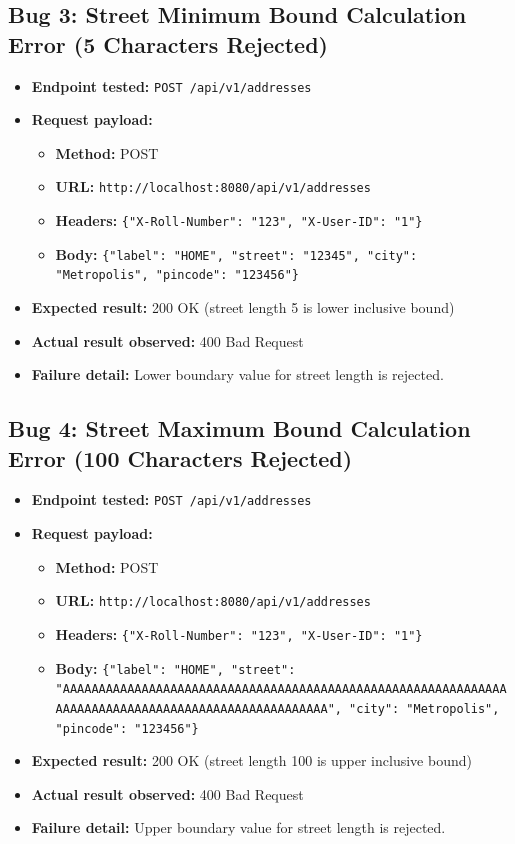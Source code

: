 ﻿\documentclass[11pt,a4paper]{article}
\begin{document}
\subsection*{Bug 3: Street Minimum Bound Calculation Error (5 Characters Rejected)}
\begin{itemize}
  \item \textbf{Endpoint tested:} \texttt{POST /api/v1/addresses}
  \item \textbf{Request payload:}
  \begin{itemize}
    \item \textbf{Method:} POST
    \item \textbf{URL:} \texttt{http://localhost:8080/api/v1/addresses}
    \item \textbf{Headers:} \texttt{\{"X-Roll-Number": "123", "X-User-ID": "1"\}}
    \item \textbf{Body:} \texttt{\{"label": "HOME", "street": "12345", "city": "Metropolis", "pincode": "123456"\}}
  \end{itemize}
  \item \textbf{Expected result:} 200 OK (street length 5 is lower inclusive bound)
  \item \textbf{Actual result observed:} 400 Bad Request
  \item \textbf{Failure detail:} Lower boundary value for street length is rejected.
\end{itemize}

\subsection*{Bug 4: Street Maximum Bound Calculation Error (100 Characters Rejected)}
\begin{itemize}
  \item \textbf{Endpoint tested:} \texttt{POST /api/v1/addresses}
  \item \textbf{Request payload:}
  \begin{itemize}
    \item \textbf{Method:} POST
    \item \textbf{URL:} \texttt{http://localhost:8080/api/v1/addresses}
    \item \textbf{Headers:} \texttt{\{"X-Roll-Number": "123", "X-User-ID": "1"\}}
    \item \textbf{Body:} \texttt{\{"label": "HOME", "street": "AAAAAAAAAAAAAAAAAAAAAAAAAAAAAAAAAAAAAAAAAAAAAAAAAAAAAAAAAAAAAAAAAAAAAAAAAAAAAAAAAAAAAAAAAAAAAAAAAAAA", "city": "Metropolis", "pincode": "123456"\}}
  \end{itemize}
  \item \textbf{Expected result:} 200 OK (street length 100 is upper inclusive bound)
  \item \textbf{Actual result observed:} 400 Bad Request
  \item \textbf{Failure detail:} Upper boundary value for street length is rejected.
\end{itemize}
\end{document}
